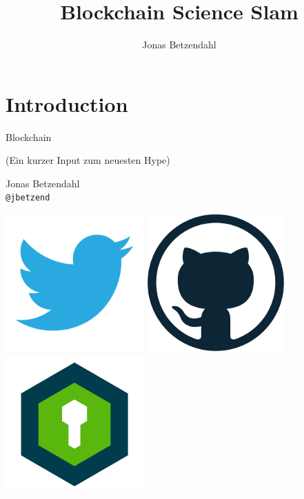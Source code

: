 \documentclass[aspectratio=169,x11names]{beamer}
\author{Jonas Betzendahl}
\title{Blockchain Science Slam}
\begin{document}
\section{Introduction}

\begin{frame}
\begin{center}
\Large \glqq Blockchain\grqq
\normalsize 

(Ein kurzer Input zum neuesten Hype)
\bigskip\bigskip

\Large Jonas Betzendahl\\
\texttt{@jbetzend}
\smallskip

\href{https://twitter.com/jbetzend}{\includegraphics[scale=0.125]{images/twitter_logo.png}}
\href{https://github.com/lambdaTotoro}{\includegraphics[scale=0.125]{images/github_logo.png}}
\href{https://whispeer.de/en/user/jbetzend}{\includegraphics[scale=0.125]{images/whispeer_logo.png}}
\end{center}
\end{frame}
\end{document}
